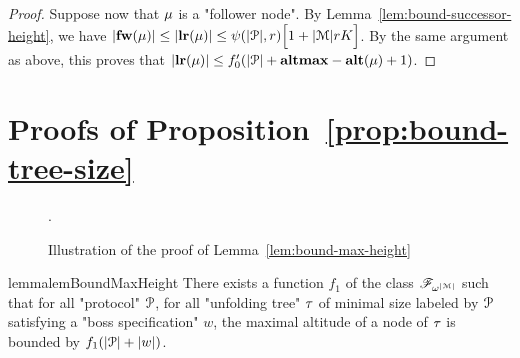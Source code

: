 \begin{proof}
	Suppose now that $\mu$ is a "follower node". By Lemma~\ref{lem:bound-successor-height}, we have 
	$|\mathbf{fw}(\mu)| \leq |\mathbf{lr}(\mu)| \leq \psi(|\mathcal{P}|,r) \Big[1+|\mathcal{M}|rK\Big]$.
	By the same argument as above, this proves that $|\mathbf{lr}(\mu)| \leq f_0'(|\mathcal{P}| + \mathbf{altmax} - \mathbf{alt}(\mu)+1)$.
\end{proof}



\section{Proofs of Proposition~\ref{prop:bound-tree-size}}
\label{app:bound-tree-size}

\begin{figure}[h]
	
	\caption{Illustration of the proof of Lemma~\ref{lem:bound-max-height}}.
	\label{fig:max-height-bound}
\end{figure}
\begin{restatable}{lemma}{lemBoundMaxHeight}
	\label{lem:bound-max-height}
	There exists a function $f_1$ of the class $\mathscr{F}_{\omega^{|\mathcal{M}|}}$ such that for all "protocol" $\mathcal{P}$, for all "unfolding tree" $\tau$ of minimal size labeled by $\mathcal{P}$ satisfying a "boss specification" $w$, the maximal altitude of a node of $\tau$ is bounded by $f_1(|\mathcal{P}| + |w|)$.
\end{restatable}
